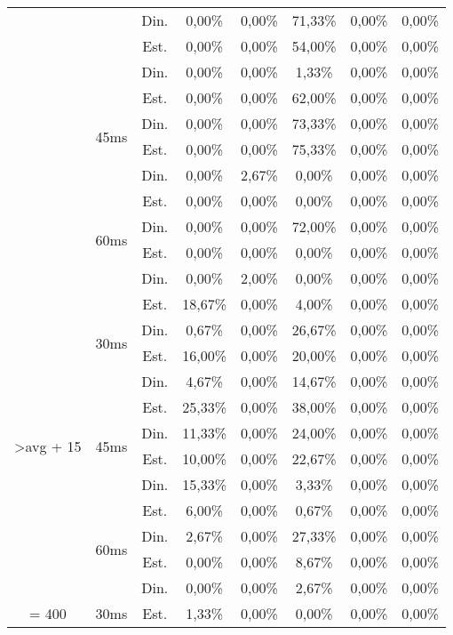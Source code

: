\begin{center}
\begin{longtable}{|c|c|c|ccccc|}
 &  & Din. & 0,00\% & 0,00\% & 71,33\% & 0,00\% & 0,00\% \\
 &  & Est. & 0,00\% & 0,00\% & 54,00\% & 0,00\% & 0,00\% \\
 &  & Din. & 0,00\% & 0,00\% & 1,33\% & 0,00\% & 0,00\% \\ \cline{2-8} 
 & \multirow{4}{*}{45ms} & Est. & 0,00\% & 0,00\% & 62,00\% & 0,00\% & 0,00\% \\
 &  & Din. & 0,00\% & 0,00\% & 73,33\% & 0,00\% & 0,00\% \\
 &  & Est. & 0,00\% & 0,00\% & 75,33\% & 0,00\% & 0,00\% \\
 &  & Din. & 0,00\% & 2,67\% & 0,00\% & 0,00\% & 0,00\% \\ \cline{2-8} 
 & \multirow{4}{*}{60ms} & Est. & 0,00\% & 0,00\% & 0,00\% & 0,00\% & 0,00\% \\
 &  & Din. & 0,00\% & 0,00\% & 72,00\% & 0,00\% & 0,00\% \\
 &  & Est. & 0,00\% & 0,00\% & 0,00\% & 0,00\% & 0,00\% \\
 &  & Din. & 0,00\% & 2,00\% & 0,00\% & 0,00\% & 0,00\% \\ \hline
\multirow{12}{*}{\textgreater avg + 15} & \multirow{4}{*}{30ms} & Est. & 18,67\% & 0,00\% & 4,00\% & 0,00\% & 0,00\% \\
 &  & Din. & 0,67\% & 0,00\% & 26,67\% & 0,00\% & 0,00\% \\
 &  & Est. & 16,00\% & 0,00\% & 20,00\% & 0,00\% & 0,00\% \\
 &  & Din. & 4,67\% & 0,00\% & 14,67\% & 0,00\% & 0,00\% \\ \cline{2-8} 
 & \multirow{4}{*}{45ms} & Est. & 25,33\% & 0,00\% & 38,00\% & 0,00\% & 0,00\% \\
 &  & Din. & 11,33\% & 0,00\% & 24,00\% & 0,00\% & 0,00\% \\
 &  & Est. & 10,00\% & 0,00\% & 22,67\% & 0,00\% & 0,00\% \\
 &  & Din. & 15,33\% & 0,00\% & 3,33\% & 0,00\% & 0,00\% \\ \cline{2-8} 
 & \multirow{4}{*}{60ms} & Est. & 6,00\% & 0,00\% & 0,67\% & 0,00\% & 0,00\% \\
 &  & Din. & 2,67\% & 0,00\% & 27,33\% & 0,00\% & 0,00\% \\
 &  & Est. & 0,00\% & 0,00\% & 8,67\% & 0,00\% & 0,00\% \\
 &  & Din. & 0,00\% & 0,00\% & 2,67\% & 0,00\% & 0,00\% \\ \hline
\multirow{12}{*}{= 400} & \multirow{4}{*}{30ms} & Est. & 1,33\% & 0,00\% & 0,00\% & 0,00\% & 0,00\% \\

\end{longtable}
\end{center}
